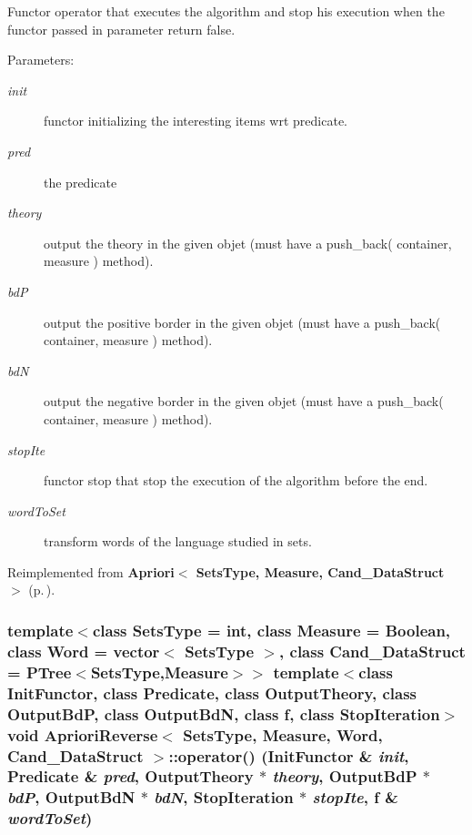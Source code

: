 Functor operator that executes the algorithm and stop his execution when the functor passed in parameter return false. 

\begin{Desc}
\item[Parameters:]
\begin{description}
\item[{\em init}]functor initializing the interesting items wrt predicate. \item[{\em pred}]the predicate \item[{\em theory}]output the theory in the given objet (must have a push\_\-back( container, measure ) method). \item[{\em bd\-P}]output the positive border in the given objet (must have a push\_\-back( container, measure ) method). \item[{\em bd\-N}]output the negative border in the given objet (must have a push\_\-back( container, measure ) method). \item[{\em stop\-Ite}]functor stop that stop the execution of the algorithm before the end. \item[{\em word\-To\-Set}]transform words of the language studied in sets. \end{description}
\end{Desc}


Reimplemented from {\bf Apriori$<$ Sets\-Type, Measure, Cand\_\-Data\-Struct $>$} {\rm (p.\,\pageref{class_apriori_117edc08779546395973171927fb8a77})}.
\subsubsection{\setlength{\rightskip}{0pt plus 5cm}template$<$class Sets\-Type = int, class Measure = Boolean, class Word = vector$<$ Sets\-Type $>$, class Cand\_\-Data\-Struct = PTree$<$Sets\-Type,Measure$>$$>$ template$<$class Init\-Functor, class Predicate, class Output\-Theory, class Output\-Bd\-P, class Output\-Bd\-N, class f, class Stop\-Iteration$>$ void {\bf Apriori\-Reverse}$<$ Sets\-Type, Measure, Word, Cand\_\-Data\-Struct $>$::operator() (Init\-Functor \& {\em init}, {\bf Predicate} \& {\em pred}, Output\-Theory $\ast$ {\em theory}, Output\-Bd\-P $\ast$ {\em bd\-P}, Output\-Bd\-N $\ast$ {\em bd\-N}, Stop\-Iteration $\ast$ {\em stop\-Ite}, f \& {\em word\-To\-Set})\hspace{0.3cm}{\tt  [inline]}}\label{class_apriori_reverse_d898f211e89442230c64651031388e3d}


